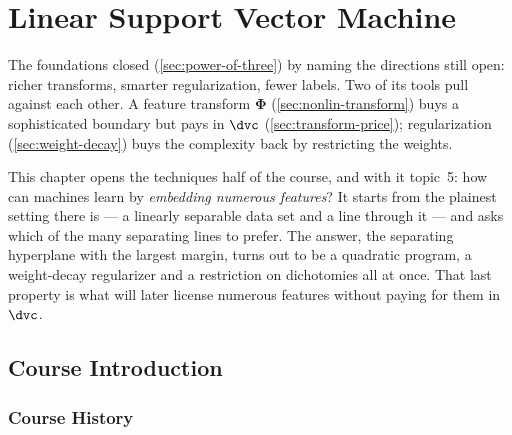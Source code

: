 \chapter{Linear Support Vector Machine}

\begin{prev}
    The foundations closed (\autoref{sec:power-of-three}) by naming the
    directions still open: richer transforms, smarter regularization, fewer
    labels. Two of its tools pull against each other. A feature transform
    \(\bm{\Phi}\) (\autoref{sec:nonlin-transform}) buys a sophisticated
    boundary but pays in \(\dvc\) (\autoref{sec:transform-price});
    regularization (\autoref{sec:weight-decay}) buys the complexity back by
    restricting the weights.
\end{prev}

This chapter opens the techniques half of the course, and with it topic~5:
how can machines learn by \emph{embedding numerous features}? It starts from
the plainest setting there is --- a linearly separable data set and a line
through it --- and asks which of the many separating lines to prefer. The
answer, the separating hyperplane with the largest margin, turns out to be a
quadratic program, a weight-decay regularizer and a restriction on
dichotomies all at once. That last property is what will later license
numerous features without paying for them in \(\dvc\).

\section{Course Introduction}\label{sec:mlt-intro}


\subsection{Course History}

